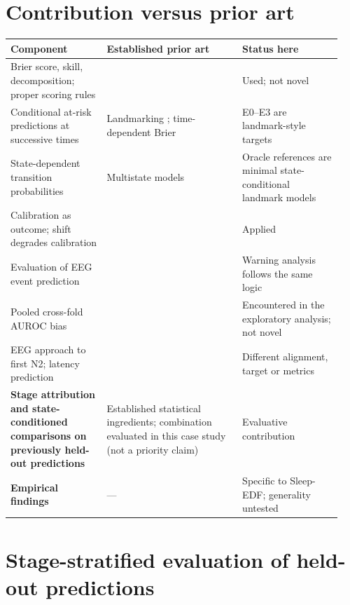 \documentclass{article}
\begin{document}
\section{Contribution versus prior art}
\label{app:priorart}
{\footnotesize
\setlength{\tabcolsep}{3pt}
\begin{longtable}{@{}p{0.27\linewidth}p{0.38\linewidth}p{0.29\linewidth}@{}}
\toprule
Component & Established prior art & Status here \\
\midrule
\endhead
Brier score, skill, decomposition; proper scoring rules & \citet{brier1950,murphy1973partition,gneiting2007scoring} & Used; not novel \\
Conditional at-risk predictions at successive times & Landmarking \citep{vanhouwelingen2007landmark}; time-dependent Brier \citep{graf1999assessment} & E0--E3 are landmark-style targets \\
State-dependent transition probabilities & Multistate models \citep{putter2007multistate} & Oracle references are minimal state-conditional landmark models \\
Calibration as outcome; shift degrades calibration & \citet{vancalster2019calibration,ovadia2019trust,collins2024tripodai} & Applied \\
Evaluation of EEG event prediction & \citet{winterhalder2003spc,proix2021seizure} & Warning analysis follows the same logic \\
Pooled cross-fold AUROC bias & \citet{forman2010apples} & Encountered in the exploratory analysis; not novel \\
EEG approach to first N2; latency prediction & \citet{li2025falling,su2026presleep,beppu2025latency,oh2024medisol,kweon2026ssfset} & Different alignment, target or metrics \\
\textbf{Stage attribution and state-conditioned comparisons on previously held-out predictions} & Established statistical ingredients; combination evaluated in this case study (not a priority claim) & Evaluative contribution \\
\textbf{Empirical findings} & --- & Specific to Sleep-EDF; generality untested \\
\bottomrule
\end{longtable}}

\FloatBarrier
\section{Stage-stratified evaluation of held-out predictions}
\label{app:state_strata}
\TableRtwoFull
\end{document}
